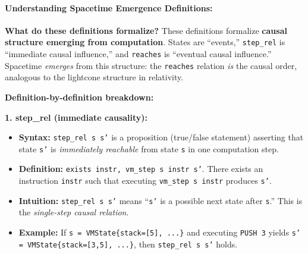 \paragraph{Understanding Spacetime Emergence Definitions:}

\textbf{What do these definitions formalize?} These definitions formalize \textbf{causal structure emerging from computation}. States are ``events,'' \texttt{step\_rel} is ``immediate causal influence,'' and \texttt{reaches} is ``eventual causal influence.'' Spacetime \textit{emerges} from this structure: the \texttt{reaches} relation \textit{is} the causal order, analogous to the lightcone structure in relativity.

\textbf{Definition-by-definition breakdown:}

\textbf{1. step\_rel (immediate causality):}
\begin{itemize}
    \item \textbf{Syntax:} \texttt{step\_rel s s'} is a proposition (true/false statement) asserting that state \texttt{s'} is \textit{immediately reachable} from state \texttt{s} in one computation step.
    
    \item \textbf{Definition:} \texttt{exists instr, vm\_step s instr s'}. There exists an instruction \texttt{instr} such that executing \texttt{vm\_step s instr} produces \texttt{s'}.
    
    \item \textbf{Intuition:} \texttt{step\_rel s s'} means ``\texttt{s'} is a possible next state after \texttt{s}.'' This is the \textit{single-step causal relation}.
    
    \item \textbf{Example:} If \texttt{s = VMState\{stack=[5], ...\}} and executing \texttt{PUSH 3} yields \texttt{s' = VMState\{stack=[3,5], ...\}}, then \texttt{step\_rel s s'} holds.
\end{itemize}

